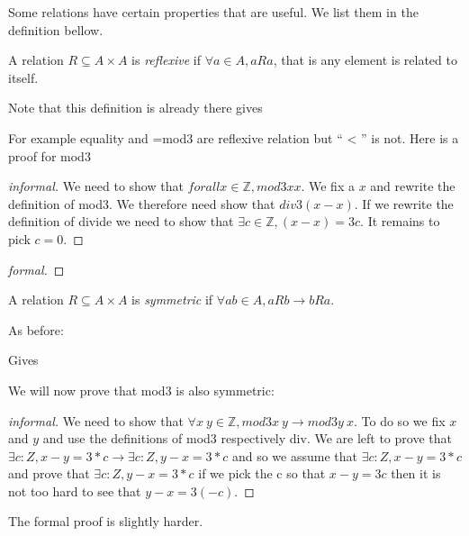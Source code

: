 Some relations have certain properties that are useful. We list them in the definition bellow. 
\begin{definition}[reflexive]
A relation $R \subseteq A\times A$ is {\it reflexive} if $\forall a \in A, a Ra$, that is any element is related to itself.
\end{definition}

Note that this definition is already there
gives


For example equality and =mod3  are reflexive relation but `` < '' is not. Here is a proof for mod3

\begin{proof}[informal]
We need to show that $forall x \in \mathbb{Z}, mod3 x x$. We fix a $x$ and rewrite the definition of mod3. We therefore need show that $div 3 (x-x)$. If we rewrite  the definition of divide we need to show that $\exists c \in \mathbb{Z}, (x-x) = 3c$. It remains to pick $c=0$.
\end{proof}
\begin{proof}[formal]
\end{proof}

 \begin{definition}[symmetric]
A relation $R\subseteq A\times A$ is {\it symmetric} if $\forall a b\in A, a R b \rightarrow b R a$.
\end{definition}

As before:

Gives


We will now prove that mod3 is also symmetric:
\begin{proof}[informal]
We need to show that $\forall x\  y \in \mathbb{Z}, mod3 x\ y \rightarrow mod3 y\ x$. To do so we fix $x$ and $y$ and use the definitions of mod3 respectively div. We are left to prove that $\exists c : Z, x - y = 3 * c\rightarrow \exists c : Z, y - x = 3 * c$ and so we assume that $\exists c : Z, x - y = 3 * c$ and prove that $\exists c : Z, y- x = 3 * c$ if we pick the c so that $x-y =3c$ then it is not too hard to see that $y-x = 3(-c)$.
\end{proof}
The formal proof is slightly harder.

